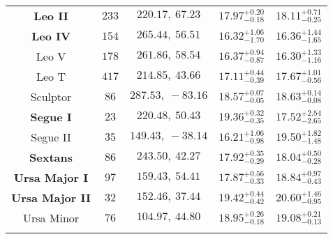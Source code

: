 \begin{table}[ht]
{\begin{tabular}{ccccc}
    \CellTopTwo{}
    \textbf{Leo II} & $233$ & $220.17,\: 67.23$ & $17.97^{+0.20}_{-0.18}$ &  $18.11^{+0.71}_{-0.25}$  \\
    \CellTopTwo{}
    \textbf{Leo IV} & $154$ & $265.44,\: 56.51$ & $16.32^{+1.06}_{-1.70}$ & $16.36^{+1.44}_{-1.65}$  \\
    \CellTopTwo{}
    Leo V & $178$ & $261.86,\: 58.54$ & $16.37^{+0.94}_{-0.87}$ & $16.30^{+1.33}_{-1.16}$  \\
    \CellTopTwo{}
    Leo T & $417$ & $214.85,\: 43.66$ & $17.11^{+0.44}_{-0.39}$ & $17.67^{+1.01}_{-0.56}$  \\
    \CellTopTwo{}
    Sculptor & $86$ & $287.53,\: -83.16$ & $18.57^{+0.07}_{-0.05}$ &  $18.63^{+0.14}_{-0.08}$  \\
    \CellTopTwo{}
    \textbf{Segue I} & $23$ & $220.48,\: 50.43$ & $19.36^{+0.32}_{-0.35}$ &  $17.52^{+2.54}_{-2.65}$  \\
    \CellTopTwo{}
    Segue II & $35$ & $149.43,\: -38.14$ & $16.21^{+1.06}_{-0.98}$ & $19.50^{+1.82}_{-1.48}$  \\
    \CellTopTwo{}
    \textbf{Sextans} & $86$ & $243.50,\: 42.27$ & $17.92^{+0.35}_{-0.29}$ &  $18.04^{+0.50}_{-0.28}$  \\
    \CellTopTwo{}
    \textbf{Ursa Major I} & $97$ & $159.43,\: 54.41$ & $17.87^{+0.56}_{-0.33}$ & $18.84^{+0.97}_{-0.43}$  \\
    \CellTopTwo{}
    \textbf{Ursa Major II} & $32$ & $152.46,\: 37.44$ & $19.42^{+0.44}_{-0.42}$ & $20.60^{+1.46}_{-0.95}$  \\
    \CellTopTwo{}
    Ursa Minor & $76$ & $104.97,\: 44.80$ & $18.95^{+0.26}_{-0.18}$ & $19.08^{+0.21}_{-0.13}$  \\
    \hline
    \hline
    \CellTopTwo{}
    \end{tabular}}
    \label{tab:J_factor}
    \end{table}